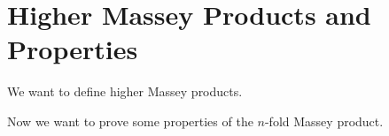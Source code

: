 
\section{Higher Massey Products and Properties}

We want to define higher Massey products.

\begin{Def}
\end{Def}

Now we want to prove some properties of the $ n $-fold Massey product.

\begin{Thm}
\end{Thm}

